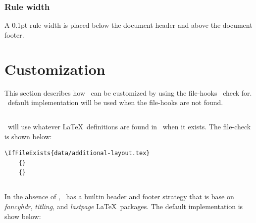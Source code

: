 \documentclass[12pt]{tlc-article}
\begin{document}
\subsubsection*{Rule width}
A 0.1pt rule width is placed below the document header and above the document
footer.

\clearpage
\section{Customization}
This section describes how \tlcA\ can be customized by using the file-hooks
\tlcA\ check for.  \tlcA\ default implementation will be used when the
file-hooks are not found.

\bigskip

%

\subsection{\tlcAL}
\tlcA\ will use whatever \LaTeX\ definitions are found in \tlcAL\ when it
exists.  The file-check is shown
below:

\begin{lstlisting}[basicstyle=\tiny]
  \IfFileExists{data/additional-layout.tex}
    {}
    {}
\end{lstlisting}

\subsection{\tlcHF}
In the absence of \tlcHF, \tlcA\ has a builtin header and footer strategy that
is base on \textit{fancyhdr}, \textit{titling}, and \textit{lastpage} \LaTeX\
packages. The default implementation is show below:
\end{document}
